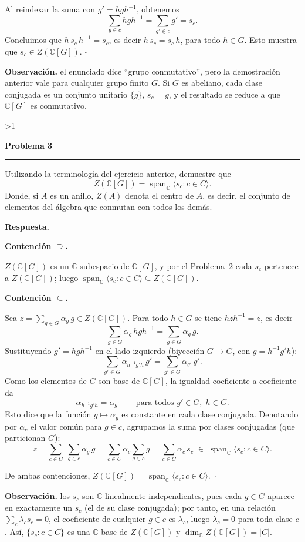 \documentclass[10pt,a4paper]{article}
\newcommand{\CC}{\mathbb{C}}
\newcommand{\inlinehead}[2][repblue]{%
  \par\smallskip
  {\color{#1}\bfseries #2.}\hspace{0.45em}%
}
\newcommand{\blockhead}[2][repteal]{%
  \par\smallskip
  {\color{#1}\bfseries #2.}\par\nobreak\smallskip
}
\newcommand{\answer}{\inlinehead{Respuesta}}
\newcommand{\subhead}[1]{\blockhead{#1}}
\newcommand{\notehead}[1]{\inlinehead[repgray]{#1}}
\newcounter{probcnt}
\newcommand{\problem}[2]{%
  \stepcounter{probcnt}%
  \ifnum\value{probcnt}>1\newpage\fi
  \par\vspace{0.25em}
  {\large\bfseries\color{repblue} Problema #1}\par
  {\color{repline}\rule{\linewidth}{0.55pt}}\par
  \begin{tcolorbox}[
    breakable,
    colback=white,
    colframe=repline,
    borderline west={1.6pt}{0pt}{repteal},
    left=0.7em,
    right=0.7em,
    top=0.35em,
    bottom=0.3em,
    before skip=0.35em,
    after skip=0.45em
  ]
    #2
  \end{tcolorbox}
}
\begin{document}
Al reindexar la suma con $g'=hgh^{-1}$, obtenemos
\[
  \sum_{g\in c}hgh^{-1}=\sum_{g'\in c}g'=s_c.
\]
Concluimos que $h\,s_c\,h^{-1}=s_c$, es decir $h\,s_c=s_c\,h$,
para todo $h\in G$. Esto muestra que $s_c\in Z(\CC[G])$. \hfill$\square$

\notehead{Observación} el enunciado dice ``grupo conmutativo'', pero la demostración
anterior vale para cualquier grupo finito $G$. Si $G$ es abeliano,
cada clase conjugada es un conjunto unitario $\{g\}$, $s_c=g$,
y el resultado se reduce a que $\CC[G]$ es conmutativo.

\problem{3}{%
Utilizando la terminología del ejercicio anterior, demuestre que
\[
  Z(\CC[G]) = \operatorname{span}_{\CC}\langle s_c : c \in C \rangle.
\]
Donde, si $A$ es un anillo, $Z(A)$ denota el centro de $A$, es decir,
el conjunto de elementos del álgebra que conmutan con todos los demás.
}

\answer

\subhead{Contención $\supseteq$}
$Z(\CC[G])$ es un $\CC$-subespacio de $\CC[G]$, y por el Problema~2 cada $s_c$
pertenece a $Z(\CC[G])$; luego
$\operatorname{span}_{\CC}\langle s_c : c\in C\rangle\subseteq Z(\CC[G])$.

\subhead{Contención $\subseteq$}
Sea $z=\sum_{g\in G}\alpha_g\,g\in Z(\CC[G])$.
Para todo $h\in G$ se tiene $hzh^{-1}=z$, es decir
\[
  \sum_{g\in G}\alpha_g\,hgh^{-1}
  =\sum_{g\in G}\alpha_g\,g.
\]
Sustituyendo $g'=hgh^{-1}$ en el lado izquierdo
(biyección $G\to G$, con $g=h^{-1}g'h$):
\[
  \sum_{g'\in G}\alpha_{h^{-1}g'h}\,g'
  =\sum_{g'\in G}\alpha_{g'}\,g'.
\]
Como los elementos de $G$ son base de $\CC[G]$,
la igualdad coeficiente a coeficiente da
\[
  \alpha_{h^{-1}g'h}=\alpha_{g'}\qquad
  \text{para todos }g'\in G,\;h\in G.
\]
Esto dice que la función $g\mapsto\alpha_g$ es constante
en cada clase conjugada.
Denotando por $\alpha_c$ el valor común para $g\in c$,
agrupamos la suma por clases conjugadas (que particionan $G$):
\[
  z=\sum_{c\in C}\;\sum_{g\in c}\alpha_g\,g
   =\sum_{c\in C}\alpha_c\sum_{g\in c}g
   =\sum_{c\in C}\alpha_c\,s_c
   \;\in\;\operatorname{span}_{\CC}\langle s_c:c\in C\rangle.
\]

De ambas contenciones,
$Z(\CC[G])=\operatorname{span}_{\CC}\langle s_c:c\in C\rangle$.
\hfill$\square$

\notehead{Observación} los $s_c$ son $\CC$-linealmente independientes,
pues cada $g\in G$ aparece en exactamente un $s_c$ (el de su clase conjugada);
por tanto, en una relación $\sum_c\lambda_c s_c=0$, el coeficiente de cualquier
$g\in c$ es $\lambda_c$, luego $\lambda_c=0$ para toda clase $c$.
Así, $\{s_c:c\in C\}$ es una $\CC$-base de $Z(\CC[G])$ y
$\dim_\CC Z(\CC[G])=|C|$.
\end{document}
